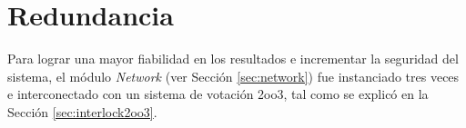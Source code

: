\section{Redundancia}

	\label{sec:VHDL2oo3}
	
	Para lograr una mayor fiabilidad en los resultados e incrementar la seguridad del sistema, el módulo \textit{Network} (ver Sección \ref{sec:network}) fue instanciado tres veces e interconectado con un sistema de votación 2oo3, tal como se explicó en la Sección \ref{sec:interlock2oo3}.
